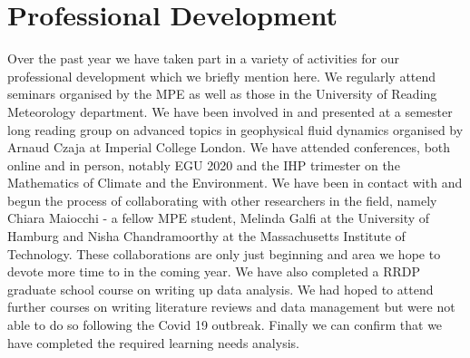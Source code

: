 \section{Professional Development}

Over the past year we have taken part in a variety of activities for our professional development which we briefly mention here. We regularly attend seminars organised by the MPE as well as those in the University of Reading Meteorology department. We have been involved in and presented at a semester long reading group on advanced topics in geophysical fluid dynamics organised by Arnaud Czaja at Imperial College London. We have attended conferences, both online and in person, notably EGU 2020 and the IHP trimester on the Mathematics of Climate and the Environment. We have been in contact with and begun the process of collaborating with other researchers in the field, namely Chiara Maiocchi - a fellow MPE student, Melinda Galfi at the University of Hamburg and Nisha Chandramoorthy at the Massachusetts Institute of Technology. These collaborations are only just beginning and area we hope to devote more time to in the coming year. We have also completed a RRDP graduate school course on writing up data analysis. We had hoped to attend further courses on writing literature reviews and data management but were not able to do so following the Covid 19 outbreak. Finally we can confirm that we have completed the required learning needs analysis.
